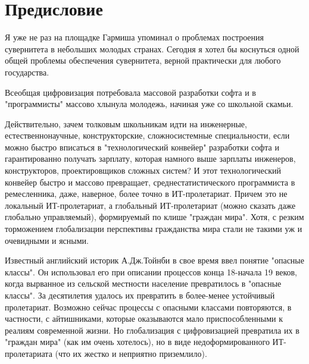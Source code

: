 
\chapter*{\LARGE Предисловие}
\label{chap_preface}

Я уже не раз на площадке Гармиша упоминал о проблемах построения сувернитета в небольших молодых странах. Сегодня я хотел бы коснуться одной общей проблемы обеспечения сувернитета, верной практически для любого государства.

Всеобщая  цифровизация потребовала массовой разработки софта и в "программисты"{} массово хлынула молодежь, начиная уже со школьной скамьи.

Действительно, зачем толковым школьникам идти на инженерные, естественнонаучные, конструкторские, сложносистемные специальности, если можно быстро вписаться в "технологический конвейер"{} разработки софта и гарантированно получать зарплату, которая намного выше зарплаты инженеров, конструкторов, проектировщиков сложных систем? И этот технологический конвейер быстро и массово превращает, среднестатистического программиста в ремесленника, даже, наверное, более точно в ИТ-пролетариат. Причем это не локальный ИТ-пролетариат, а глобальный ИТ-пролетариат (можно сказать даже глобально управляемый), формируемый по клише "граждан мира"{}. Хотя, с резким торможением глобализации перспективы гражданства мира стали  не такими уж и очевидными и ясными.

Известный английский историк А.Дж.Тойнби в свое время ввел понятие "опасные классы"{}. Он использовал его при  описании процессов конца 18-начала 19 веков, когда вырванное из сельской местности население превратилось в "опасные классы"{}. За десятилетия удалось их превратить в более-менее устойчивый пролетариат. Возможно сейчас процессы с опасными классами повторяются, в частности, с айтишниками, которые оказываются мало приспособленными к реалиям современной жизни. Но глобализация с цифровизацией превратила их в "граждан мира"{} (как им очень хотелось), но в виде недоформированного ИТ-пролетариата (что их жестко и неприятно приземлило). 

